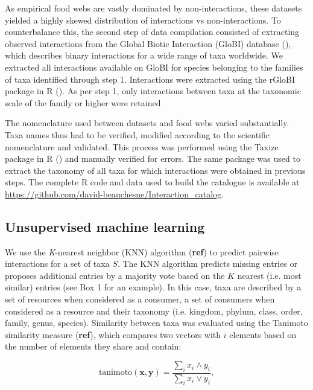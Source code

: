 \documentclass[letterpaper]{article}
\begin{document}
As empirical food webs are vastly dominated by non-interactions, these datasets yielded a highly skewed distribution of interactions vs non-interactions. To counterbalance this, the second step of data compilation consisted of extracting observed interactions from the Global Biotic Interaction (GloBI) database (\cite{Poelen2014}), which describes binary interactions for a wide range of taxa worldwide. We extracted all interactions available on GloBI for species belonging to the families of taxa identified through step 1. Interactions were extracted using the rGloBI package in R (\cite{Poelen2015}). As per step 1, only interactions between taxa at the taxonomic scale of the family or higher were retained

The nomenclature used between datasets and food webs varied substantially. Taxa names thus had to be verified, modified according to the scientific nomenclature and validated. This process was performed using the Taxize package in R (\cite{Chamberlain2013, Chamberlain2014}) and manually verified for errors. The same package was used to extract the taxonomy of all taxa for which interactions were obtained in previous steps. The complete R code and data used to build the catalogue is available at \href{https://github.com/david-beauchesne/Interaction_catalog}{https://github.com/david-beauchesne/Interaction\_catalog}.

\subsection{Unsupervised machine learning}
We use the \textit{K}-nearest neighbor (KNN) algorithm (\textbf{ref}) to predict pairwise interactions for a set of taxa $S$. The KNN algorithm predicts missing entries or proposes additional entries by a majority vote based on the $K$ nearest (i.e. most similar) entries (see Box 1 for an example). In this case, taxa are described by a set of resources when considered as a consumer, a set of consumers when considered as a resource and their taxonomy (i.e. kingdom, phylum, class, order, family, genus, species). Similarity between taxa was evaluated using the Tanimoto similarity measure (\textbf{ref}), which compares two vectors with $i$ elements based on the number of elements they share and contain:

\begin{equation}
    \mbox{tanimoto}(\mathbf{x}, \mathbf{y}) = \frac{\sum_i x_i \land y_i}{\sum_i x_i \lor y_i},
\end{equation}
\end{document}
